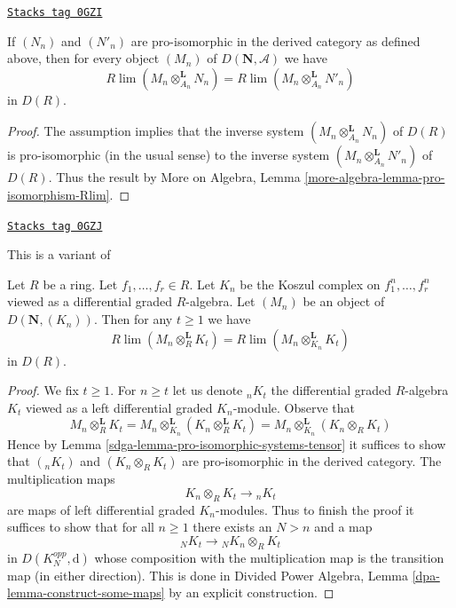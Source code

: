 \begin{lemma}
\label{sdga-lemma-pro-isomorphic-systems-tensor}
\href{https://stacks.math.columbia.edu/tag/0GZI}{\texttt{Stacks tag 0GZI}}

If $(N_n)$ and $(N'_n)$ are pro-isomorphic in the derived category
as defined above,
then for every object $(M_n)$ of $D(\mathbf{N}, \mathcal{A})$ we have
$$
R\lim (M_n \otimes_{A_n}^\mathbf{L} N_n) =
R\lim (M_n \otimes_{A_n}^\mathbf{L} N'_n)
$$
in $D(R)$.
\end{lemma}

\begin{proof}
The assumption implies that the inverse system
$(M_n \otimes_{A_n}^\mathbf{L} N_n)$ of $D(R)$ is pro-isomorphic
(in the usual sense) to the inverse system
$(M_n \otimes_{A_n}^\mathbf{L} N'_n)$ of $D(R)$.
Thus the result by
More on Algebra, Lemma \ref{more-algebra-lemma-pro-isomorphism-Rlim}.
\end{proof}

\begin{lemma}
\label{sdga-lemma-different-tensors}
\href{https://stacks.math.columbia.edu/tag/0GZJ}{\texttt{Stacks tag 0GZJ}}

\begin{reference}
This is a variant of \cite[Lemma 3.5.4]{BS}
\end{reference}
Let $R$ be a ring. Let $f_1, \ldots, f_r \in R$.
Let $K_n$ be the Koszul complex on $f_1^n, \ldots, f_r^n$
viewed as a differential graded $R$-algebra.
Let $(M_n)$ be an object of $D(\mathbf{N}, (K_n))$.
Then for any $t \geq 1$ we have
$$
R\lim (M_n \otimes_R^\mathbf{L} K_t) =
R\lim (M_n \otimes_{K_n}^\mathbf{L} K_t)
$$
in $D(R)$.
\end{lemma}

\begin{proof}

We fix $t \geq 1$. For $n \geq t$ let us denote ${}_nK_t$
the differential graded $R$-algebra $K_t$ viewed as a left differential graded
$K_n$-module. Observe that
$$
M_n \otimes_R^\mathbf{L} K_t =
M_n \otimes_{K_n}^\mathbf{L} (K_n \otimes_R^\mathbf{L} K_t) =
M_n \otimes_{K_n}^\mathbf{L} (K_n \otimes_R K_t)
$$
Hence by Lemma \ref{sdga-lemma-pro-isomorphic-systems-tensor}
it suffices to show that
$({}_nK_t)$ and $(K_n \otimes_R K_t)$ are pro-isomorphic in the
derived category. The multiplication maps
$$
K_n \otimes_R K_t \longrightarrow {}_nK_t
$$
are maps of left differential graded $K_n$-modules. Thus to finish the proof
it suffices to show that for all $n \geq 1$ there exists an $N > n$
and a map
$$
{}_NK_t \longrightarrow {}_NK_n \otimes_R K_t
$$
in $D(K_N^{opp}, \text{d})$ whose composition with the multiplication
map is the transition map (in either direction). This is done in
Divided Power Algebra, Lemma \ref{dpa-lemma-construct-some-maps}
by an explicit construction.
\end{proof}

